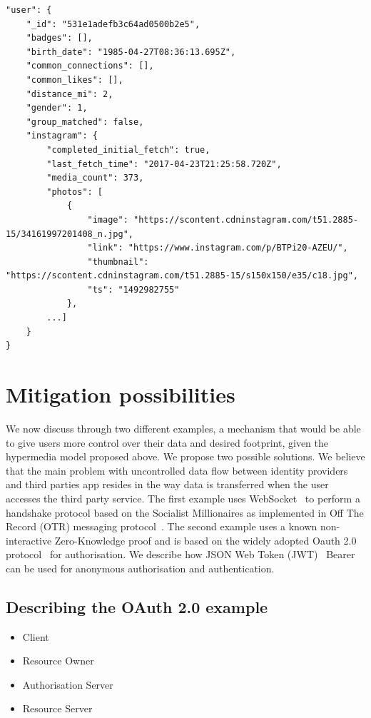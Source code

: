 \begin{lstlisting}
"user": {
    "_id": "531e1adefb3c64ad0500b2e5",
    "badges": [],
    "birth_date": "1985-04-27T08:36:13.695Z",                
    "common_connections": [],
    "common_likes": [],
    "distance_mi": 2,
    "gender": 1,
    "group_matched": false,
    "instagram": {
        "completed_initial_fetch": true,
        "last_fetch_time": "2017-04-23T21:25:58.720Z",
        "media_count": 373,
        "photos": [
            {
                "image": "https://scontent.cdninstagram.com/t51.2885-15/34161997201408_n.jpg",
                "link": "https://www.instagram.com/p/BTPi20-AZEU/",
                "thumbnail": "https://scontent.cdninstagram.com/t51.2885-15/s150x150/e35/c18.jpg",
                "ts": "1492982755"
            },
        ...]
    }
}
\end{lstlisting}

\section{Mitigation possibilities}

We now discuss through two different examples, a mechanism that would be able to give users more control over their data and desired footprint, given the hypermedia model proposed above. We propose two possible solutions. 
We believe that the main problem with uncontrolled data flow between identity providers and third parties app resides in the way data is transferred when the user accesses the third party service.
The first example uses WebSocket~\cite{fetterfc} to perform a handshake protocol based on the Socialist Millionaires as implemented in Off The Record (OTR) messaging protocol~\cite{goldberg2012off}. The second example uses a known non-interactive Zero-Knowledge proof and is based on the widely adopted Oauth 2.0 protocol~\cite{hardt2012oauth} for authorisation. We describe how JSON Web Token (JWT)~\cite{jones2015json} Bearer can be used for anonymous authorisation and authentication.

\subsection{Describing the OAuth 2.0 example}

\begin{itemize}
    \item Client
    \item Resource Owner
    \item Authorisation Server
    \item Resource Server
\end{itemize}

